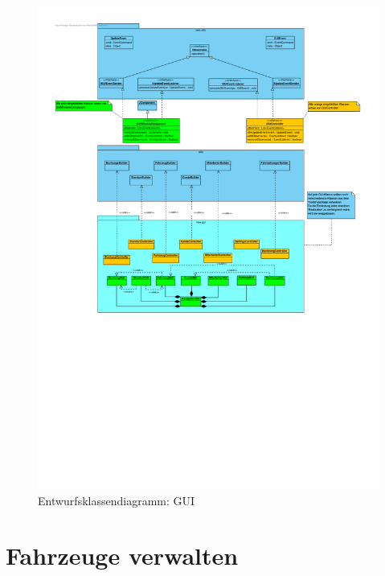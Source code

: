\begin{figure}[!ht]
    \centering
    \includegraphics[width=\textwidth, trim = 0cm 10cm 0cm 0cm]{Bilder/Diagramme/EKD_GUI.pdf}
    \caption{Entwurfsklassendiagramm: GUI}
    \label{img:ekd_gui}
\end{figure}

\newpage

\section{Fahrzeuge verwalten}

